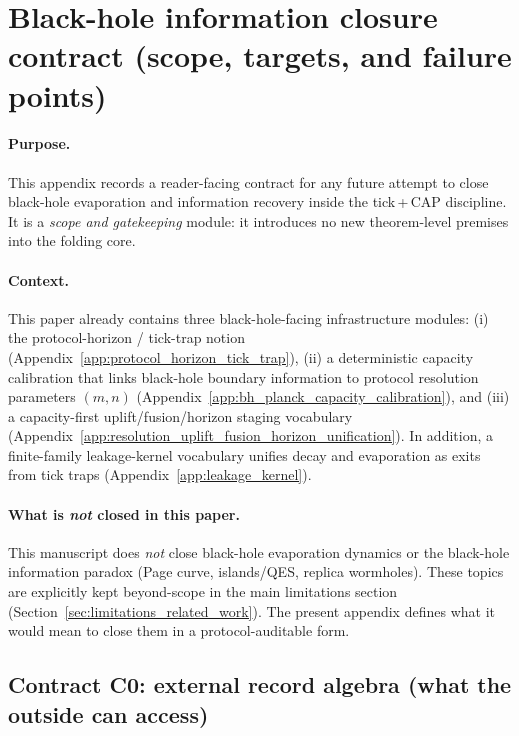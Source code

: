 \section{Black-hole information closure contract (scope, targets, and failure points)}
\label{app:bh_scope_contract}

\paragraph{Purpose.}
\AuditTag This appendix records a reader-facing contract for any future attempt to close
black-hole evaporation and information recovery inside the tick\,+\,CAP discipline.
It is a \emph{scope and gatekeeping} module: it introduces no new theorem-level premises
into the folding core.

\paragraph{Context.}
This paper already contains three black-hole-facing infrastructure modules:
(i) the protocol-horizon / tick-trap notion (Appendix~\ref{app:protocol_horizon_tick_trap}),
(ii) a deterministic capacity calibration that links black-hole boundary information to
protocol resolution parameters $(m,n)$ (Appendix~\ref{app:bh_planck_capacity_calibration}),
and (iii) a capacity-first uplift/fusion/horizon staging vocabulary (Appendix~\ref{app:resolution_uplift_fusion_horizon_unification}).
In addition, a finite-family leakage-kernel vocabulary unifies decay and evaporation as
exits from tick traps (Appendix~\ref{app:leakage_kernel}).

\paragraph{What is \emph{not} closed in this paper.}
\AuditTag This manuscript does \emph{not} close black-hole evaporation dynamics or the
black-hole information paradox (Page curve, islands/QES, replica wormholes). These topics
are explicitly kept beyond-scope in the main limitations section
(Section~\ref{sec:limitations_related_work}).
The present appendix defines what it would mean to close them in a protocol-auditable form.

\subsection{Contract C0: external record algebra (what the outside can access)}
\label{subsec:bh_contract_record_algebra}

